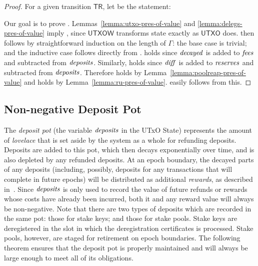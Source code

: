 \begin{proof}
  For a given transition $\mathsf{TR}$, let 
  be the statement:


  \noindent
  Our goal is to prove .
  Lemmas~\ref{lemma:utxo-pres-of-value} and \ref{lemma:delegs-pres-of-value} imply ,
  since $\mathsf{UTXOW}$ transforms state exactly as $\mathsf{UTXO}$ does.
   then follows by straightforward induction on the length of $\Gamma$:
  the base case is trivial;
  and the inductive case follows directly from .
%
   holds since $\mathit{decayed}$ is added to $\mathit{fees}$
  and subtracted from $\mathit{deposits}$.
  Similarly,  holds since $\mathit{diff}$ is added to $\mathit{reserves}$
  and subtracted from $\mathit{deposits}$.
  Therefore  holds by Lemma~\ref{lemma:poolreap-pres-of-value}
  and  holds by Lemma~\ref{lemma:ru-pres-of-value}.
   easily follows from this.
\end{proof}

\subsection{Non-negative Deposit Pot}
\label{sec:non-negative-deposit-pot}

The \emph{deposit pot} (the variable $\mathit{deposits}$ in the UTxO State)
represents the amount of \emph{lovelace} that is set aside by the system as a whole for refunding deposits.
Deposits are added to this pot, which then decays exponentially over time,
and is also depleted by any refunded deposits.
At an epoch boundary, the decayed parts of any deposits (including, possibly, deposits for any transactions that will complete in future epochs)
will be distributed as additional \emph{rewards}, as described in~\cite{delegation_design}.
Since $\mathit{deposits}$ is only used to record the value of future refunds or rewards whose costs have
already been incurred, both it and any reward value will always be non-negative.
Note that there are two types of deposits which are recorded in the same pot: those for stake keys; and those for stake pools.
Stake keys are deregistered in the slot in which the deregistration certificates
is processed. Stake pools, however, are staged for retirement on epoch boundaries.
%
The following theorem ensures that the deposit pot is properly maintained
and will always be large enough to meet all of its obligations.


